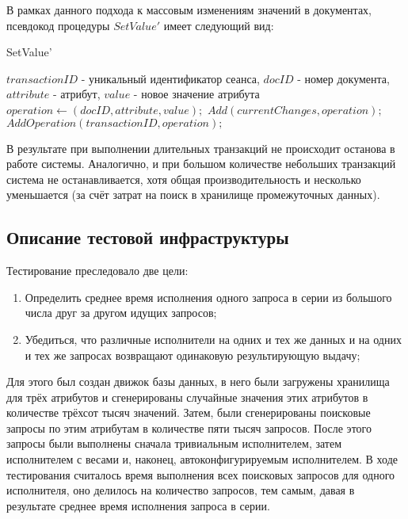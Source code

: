 \documentclass{matmex-diploma}
\begin{document}
        В рамках данного подхода к массовым изменениям значений в документах, псевдокод процедуры $SetValue'$ имеет следующий вид:
        
        \begin{algorithm}[H]                   
        \caption{SetValue'}              
        \label{update}                        
            \begin{algorithmic}
                \REQUIRE $transactionID$ - уникальный идентификатор сеанса, $docID$ - номер документа, $attribute$ - атрибут, $value$ - новое значение атрибута
                \STATE $operation \leftarrow (docID, attribute, value);$
                \STATE $Add(currentChanges, operation);$
                \STATE $AddOperation(transactionID, operation);$
            \end{algorithmic}
        \end{algorithm}
        
        В результате при выполнении длительных транзакций не происходит останова в работе системы. Аналогично, и при большом количестве небольших транзакций система не останавливается, хотя общая производительность и несколько уменьшается (за счёт затрат на поиск в хранилище промежуточных данных).
        
        
        
    \subsection{Описание тестовой инфраструктуры}
        Тестирование преследовало две цели:
            \begin{enumerate}
                \item Определить среднее время исполнения одного запроса в серии из большого числа друг за другом идущих запросов;
                \item Убедиться, что различные исполнители на одних и тех же данных и на одних и тех же запросах возвращают одинаковую результирующую выдачу; 
            \end{enumerate}
            
            Для этого был создан движок базы данных, в него были загружены хранилища для трёх атрибутов и сгенерированы случайные значения этих атрибутов в количестве трёхсот тысяч значений. Затем, были сгенерированы поисковые запросы по этим атрибутам в количестве пяти тысяч запросов. После этого запросы были выполнены сначала тривиальным исполнителем, затем исполнителем с весами и, наконец, автоконфигурируемым исполнителем. В ходе тестирования считалось время выполнения всех поисковых запросов для одного исполнителя, оно делилось на количество запросов, тем самым, давая в результате среднее время исполнения запроса в серии. 
            
\end{document}
